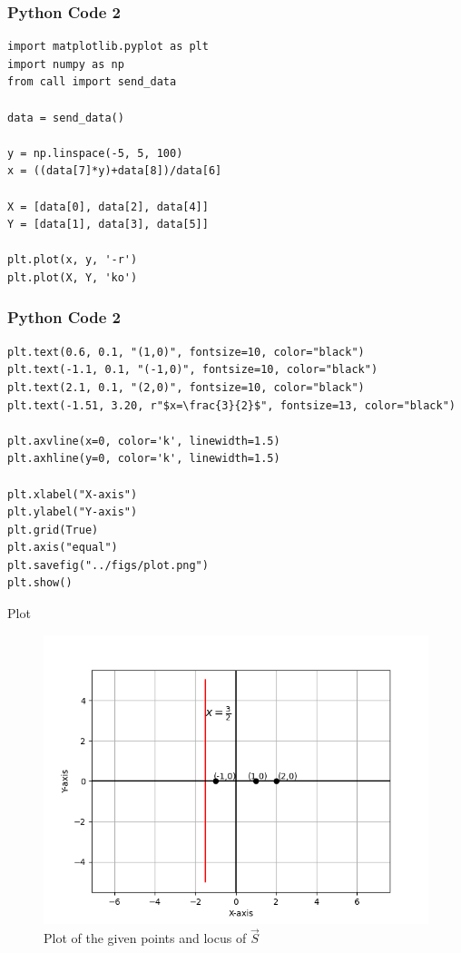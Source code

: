 \documentclass{beamer}
\begin{document}
\begin{frame}[fragile]
    \frametitle{Python Code 2}
    \begin{lstlisting}
import matplotlib.pyplot as plt
import numpy as np
from call import send_data

data = send_data()

y = np.linspace(-5, 5, 100)
x = ((data[7]*y)+data[8])/data[6]

X = [data[0], data[2], data[4]]
Y = [data[1], data[3], data[5]]

plt.plot(x, y, '-r')
plt.plot(X, Y, 'ko')
    \end{lstlisting}
\end{frame}

\begin{frame}[fragile]
    \frametitle{Python Code 2}
    \begin{lstlisting}
plt.text(0.6, 0.1, "(1,0)", fontsize=10, color="black")
plt.text(-1.1, 0.1, "(-1,0)", fontsize=10, color="black")
plt.text(2.1, 0.1, "(2,0)", fontsize=10, color="black")
plt.text(-1.51, 3.20, r"$x=\frac{3}{2}$", fontsize=13, color="black")

plt.axvline(x=0, color='k', linewidth=1.5)
plt.axhline(y=0, color='k', linewidth=1.5)

plt.xlabel("X-axis")
plt.ylabel("Y-axis")
plt.grid(True)
plt.axis("equal")
plt.savefig("../figs/plot.png")
plt.show()  \end{lstlisting}
\end{frame}

\begin{frame}{Plot}
    \begin{figure}
        \centering
        \includegraphics[width=0.5\columnwidth]{../figs/plot.png}
        \caption{Plot of the given points and locus of $\vec{S}$}
        \label{fig:fig}
    \end{figure}
\end{frame}
\end{document}
